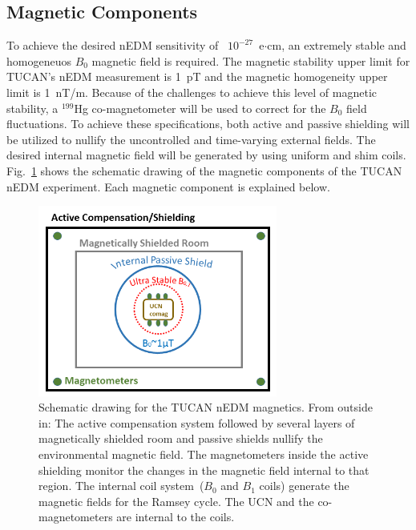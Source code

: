 \subsection{Magnetic Components}
To achieve the desired nEDM sensitivity of ~$10^{-27}$~e$\cdot$cm, an
extremely stable and homogeneuos $B_0$ magnetic field is required.
The magnetic stability upper limit for TUCAN's nEDM measurement is
1~pT and the magnetic homogeneity upper limit is 1~nT/m.
Because of the challenges to achieve this level of magnetic stability,
a $^{199}$Hg co-magnetometer will be used to correct for the $B_0$
field fluctuations. To achieve these specifications, both active and
passive shielding will be utilized to nullify the uncontrolled and
time-varying external fields. The desired internal magnetic field will
be generated by using uniform and shim
coils. Fig.~\ref{fig:magneticscheme} shows the schematic drawing of
the magnetic components of the TUCAN nEDM experiment. Each magnetic
component is explained below.

\begin{figure}[h!]
  \centering
  \includegraphics[width=0.7\textwidth]{magneticscheme.png}
  \caption{Schematic drawing for the TUCAN nEDM magnetics. From
    outside in: The active compensation system followed by several
    layers of magnetically shielded room and passive shields nullify
    the environmental magnetic field. The magnetometers inside the
    active shielding monitor the changes in the magnetic field
    internal to that region. The internal coil system~($B_0$ and $B_1$
    coils) generate the magnetic fields for the Ramsey cycle. The UCN
    and the co-magnetometers are internal to the coils.  }
  \label{fig:magneticscheme}
\end{figure}



